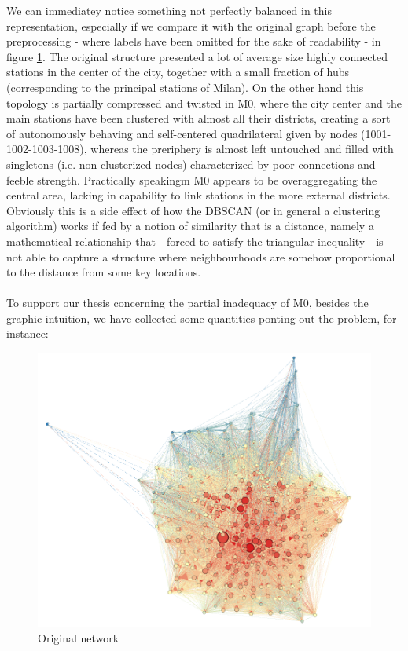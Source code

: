 \documentclass[11pt,twoside]{report}
\begin{document}
We can immediatey notice something not perfectly balanced in this representation, especially if we compare it with the original graph before the preprocessing - where labels have been omitted for the sake of readability - in figure \ref{fig:original_graph_gephi}. The original structure presented a lot of average size highly connected stations in the center of the city, together with a small fraction of hubs (corresponding to the principal stations of Milan). On the other hand this topology is partially compressed and twisted in M0, where the city center and the main stations have been clustered with almost all their districts, creating a sort of autonomously behaving and self-centered quadrilateral given by nodes (1001-1002-1003-1008), whereas the preriphery is almost left untouched and filled with singletons (i.e. non clusterized nodes) characterized by poor connections and feeble strength. Practically speakingm M0 appears to be overaggregating the central area, lacking in capability to link stations in the more external districts. Obviously this is a side effect of how the DBSCAN (or in general a clustering algorithm) works if fed by a notion of similarity that is a distance, namely a mathematical relationship that - forced to satisfy the triangular inequality - is not able to capture a structure where neighbourhoods are somehow proportional to the distance from some key locations.\\
\\
To support our thesis concerning the partial inadequacy of M0, besides the graphic intuition, we have collected some quantities ponting out the problem, for instance:

\begin{figure}[H]
	\begin{center}
		\includegraphics[width=15cm]{./pictures/original_graph_gephi.png}
	\end{center}
	\caption{Original network}
	\label{fig:original_graph_gephi}
\end{figure}
\end{document}
